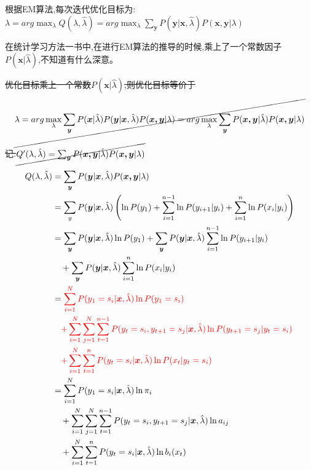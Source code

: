 \documentclass[UTF8,a4paper]{ctexart}%
\begin{document}
            根据EM算法,每次迭代优化目标为:
            $\lambda = arg \max_{\lambda} Q(\lambda , \hat{\lambda}) = arg \max_{\lambda} \sum_{\bm{y}} P(\bm{y}|\bm{x},\hat{\lambda})P(\bm{x,y}|\lambda)$

            {\color{red}
            在统计学习方法一书中,在进行EM算法的推导的时候,乘上了一个常数因子$P(\bm{x}|\hat{\lambda})$,不知道有什么深意。
            }

            \sout{优化目标乘上一个常数$P(\bm{x}|\hat{\lambda})$,则优化目标等价于}
              \[ \cancel{\lambda = arg \max_{\lambda} \sum_{\bm{y}} P(\bm{x}|\hat{\lambda})P(\bm{y}|\bm{x},\hat{\lambda})P(\bm{x,y}|\lambda) = arg \max_{\lambda} \sum_{\bm{y}}
                P(\bm{x,y}|\hat{\lambda})P(\bm{x,y}|\lambda)} \]

            \sout{记:}$\cancel{Q'(\lambda,\hat{\lambda}) = \sum_{\bm{y}} P(\bm{x,y}|\hat{\lambda})P(\bm{x,y}|\lambda)}$

            \begin{align}
              Q(\lambda,\hat{\lambda}) &= \sum_{\bm{y}} P(\bm{y}|\bm{x},\hat{\lambda})P(\bm{x,y}|\lambda)\\
                &= \sum_{y} P(\bm{y}|\bm{x},\hat{\lambda}) \left( \ln P(y_1) + \sum_{i = 1}^{n-1} \ln P(y_{i+1}|y_{i}) + \sum_{i = 1}^n \ln P(x_i|y_i) \right )\\
                &= \sum_{\bm{y}} P(\bm{y}|\bm{x},\hat{\lambda}) \ln P(y_1)
                  + \sum_{\bm{y}} P(\bm{y}|\bm{x},\hat{\lambda})  \sum_{i = 1}^{n-1} \ln P(y_{i+1}|y_{i})\\
                  &\quad + \sum_{\bm{y}} P(\bm{y}|\bm{x},\hat{\lambda}) \sum_{i = 1}^n \ln P(x_i|y_i) \notag \\
                &= {\color{red}
                \sum_{i = 1}^N  P(y_1 = s_i|\bm{x},\hat{\lambda}) \ln P(y_1 = s_i)}\label{eq-2017-5-1819:56:52}\\
                  &\quad{\color{red}
                  + \sum_{i = 1}^N \sum_{j = 1}^N \sum_{t = 1}^{n-1}
                       P(y_t = s_i , y_{t+1} = s_j|\bm{x},\hat{\lambda}) \ln P(y_{t+1} = s_j|y_{t} = s_i)} \notag \\
                  &\quad{\color{red}
                   + \sum_{i = 1}^N \sum_{t = 1}^n P(y_t = s_i|\bm{x},\hat{\lambda}) \ln P(x_t|y_t = s_i)} \notag \\
                &= \sum_{i = 1}^N  P(y_1 = s_i|\bm{x},\hat{\lambda}) \ln \pi_i\\
                  &\quad+ \sum_{i = 1}^N \sum_{j = 1}^N \sum_{t = 1}^{n-1}
                      P(y_t = s_i , y_{t+1} = s_j|\bm{x},\hat{\lambda}) \ln a_{ij} \notag\\
                  &\quad + \sum_{i = 1}^N \sum_{t = 1}^n P(y_t = s_i|\bm{x},\hat{\lambda}) \ln b_i(x_t) \notag
            \end{align}
\end{document}
